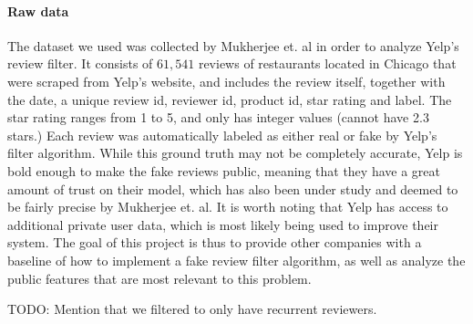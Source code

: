 \documentclass[man, floatsintext, 10pt]{apa6}
\begin{document}
\paragraph{Raw data} The dataset we used was collected by Mukherjee et. al in order to analyze Yelp's review filter. It consists of  $61,541$ reviews of restaurants located in Chicago that were scraped from Yelp's website, and includes the review itself, together with the date, a unique review id, reviewer id, product id, star rating and label. The star rating ranges from 1 to 5, and only has integer values (cannot have 2.3 stars.) Each review was automatically labeled as either real or fake by Yelp's filter algorithm. While this ground truth may not be completely accurate, Yelp is bold enough to make the fake reviews public, meaning that they have a great amount of trust on their model, which has also been under study and deemed to be fairly precise by Mukherjee et. al. It is worth noting that Yelp has access to additional private user data, which is most likely being used to improve their system. The goal of this project is thus to provide other companies with a baseline of how to implement a fake review filter algorithm, as well as analyze the public features that are most relevant to this problem.

TODO: Mention that we filtered to only have recurrent reviewers. 

\vspace{2mm}
\end{document}
